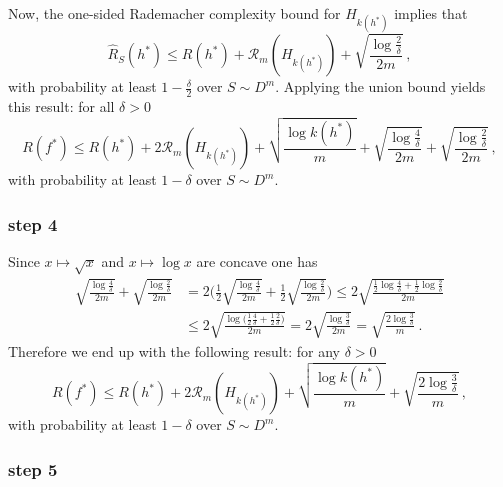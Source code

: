 \documentclass[a4paper]{article}
\begin{document}
\noindent Now, the one-sided Rademacher complexity bound for $H_{k(h^*)}$ implies
that
\[ \hat{R}_S(h^*) \leq R(h^*) + \mathcal{R}_m(H_{k(h^*)})
  + \sqrt{\frac{\log\frac{2}{\delta}}{2m}} \,, \]
with probability at least $1-\frac{\delta}{2}$ over $S\sim D^m$.
Applying the union bound yields this result: for all $\delta>0$
\[ R(f^*) \leq R(h^*) + 2\mathcal{R}_m(H_{k(h^*)})
  + \sqrt{\frac{\log k(h^*)}{m}}
  + \sqrt{\frac{\log\frac{4}{\delta}}{2m}}
  + \sqrt{\frac{\log\frac{2}{\delta}}{2m}} \,, \]
with probability at least $1-\delta$ over $S\sim D^m$.


\subsubsection*{step 4} %
\label{ssub:step_4}

Since $x\mapsto\sqrt{x}$ and $x\mapsto \log x$ are concave one has
\begin{align*}
  \sqrt{\frac{\log\frac{4}{\delta}}{2m}} + \sqrt{\frac{\log\frac{2}{\delta}}{2m}}
  &= 2 \Biggl( \frac{1}{2}\sqrt{\frac{\log\frac{4}{\delta}}{2m}}
      + \frac{1}{2} \sqrt{\frac{\log\frac{2}{\delta}}{2m}} \Biggr)
  \leq 2 \sqrt{\frac{\frac{1}{2} \log\frac{4}{\delta}+\frac{1}{2} \log\frac{2}{\delta}}{2m}} \\
  &\leq 2 \sqrt{\frac{\log\bigl(\frac{1}{2}\frac{4}{\delta} + \frac{1}{2} \frac{2}{\delta}\bigr)}{2m}}
  = 2 \sqrt{\frac{\log\frac{3}{\delta}}{2m}}
  = \sqrt{\frac{2\log\frac{3}{\delta}}{m}} \,.
\end{align*}
Therefore we end up with the following result: for any $\delta>0$
\[ R(f^*) \leq R(h^*) + 2\mathcal{R}_m(H_{k(h^*)})
          + \sqrt{\frac{\log k(h^*)}{m}}
          + \sqrt{\frac{2\log\frac{3}{\delta}}{m}}
  \,, \]
with probability at least $1-\delta$ over $S\sim D^m$.


\subsubsection*{step 5} %
\label{ssub:step_5}
\end{document}
